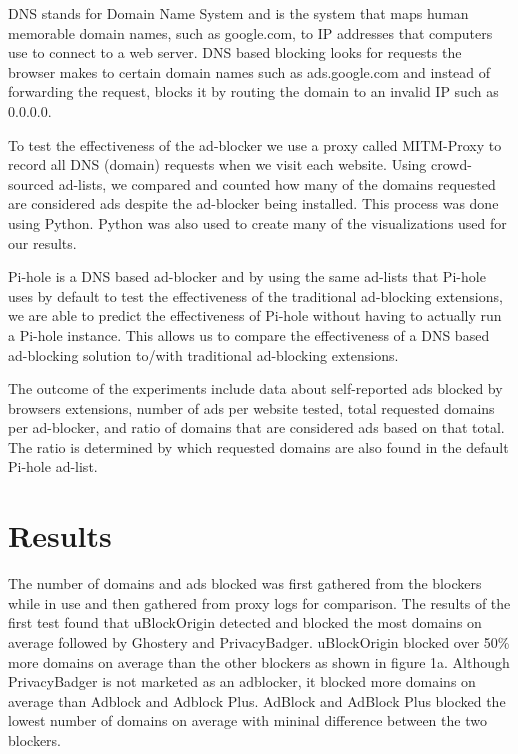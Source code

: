 \documentclass[sigsmall]{acmart}
\begin{document}
DNS stands for Domain Name System and is the system that maps human memorable domain names, such as google.com, to IP addresses that computers use to connect to a web server. DNS based blocking looks for requests the browser makes to certain domain names such as ads.google.com and instead of forwarding the request, blocks it by routing the domain to an invalid IP such as 0.0.0.0.

To test the effectiveness of the ad-blocker we use a proxy called MITM-Proxy to record all DNS (domain) requests when we visit each website. Using crowd-sourced ad-lists, we compared and counted how many of the domains requested are considered ads despite the ad-blocker being installed. This process was done using Python. Python was also used to create many of the visualizations used for our results.

Pi-hole is a DNS based ad-blocker and by using the same ad-lists that Pi-hole uses by default to test the effectiveness of the traditional ad-blocking extensions, we are able to predict the effectiveness of Pi-hole without having to actually run a Pi-hole instance. This allows us to compare the effectiveness of a DNS based ad-blocking solution to/with traditional ad-blocking extensions.

The outcome of the experiments include data about self-reported ads blocked by browsers extensions, number of ads per website tested, total requested domains per ad-blocker, and ratio of domains that are considered ads based on that total. The ratio is determined by which requested domains are also found in the default Pi-hole ad-list.

\section*{Results}
The number of domains and ads blocked was first gathered from the blockers while in use and then gathered from proxy logs for comparison. The results of the first test found that uBlockOrigin detected and blocked the most domains on average followed by Ghostery and PrivacyBadger. uBlockOrigin blocked over 50\% more domains on average than the other blockers as shown in figure 1a. Although PrivacyBadger is not marketed as an adblocker, it blocked more domains on average than Adblock and Adblock Plus. 
AdBlock and AdBlock Plus blocked the lowest number of domains on average with mininal difference between the two blockers.  
 
\end{document}
